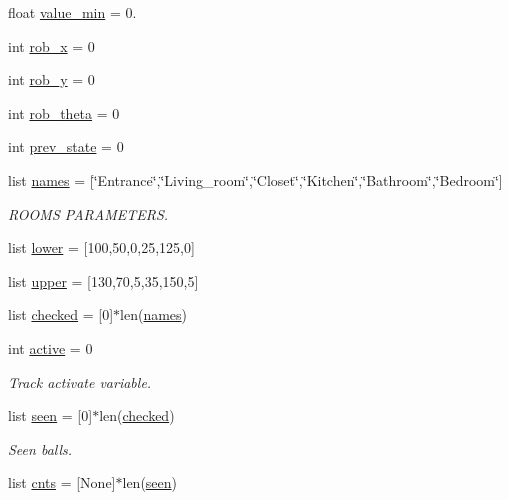 \begin{DoxyCompactItemize}
\item 
float \hyperlink{namespacePerception_ac133c0d0f793260fe4d078d02ec777b6}{value\+\_\+min} = 0.
\item 
int \hyperlink{namespacePerception_a47402108dd4d75ac8a27e5d917aa022c}{rob\+\_\+x} = 0
\item 
int \hyperlink{namespacePerception_ace15e3c972e7a909673f2280e02954a5}{rob\+\_\+y} = 0
\item 
int \hyperlink{namespacePerception_ab4a40230ffe1d9f53908c2c5c6fd6ebb}{rob\+\_\+theta} = 0
\item 
int \hyperlink{namespacePerception_ad34a03e4d4afc6f3f824f912c28692ff}{prev\+\_\+state} = 0
\item 
list \hyperlink{namespacePerception_ade020d1959a087b5a07fd0936a5f489d}{names} = \mbox{[}\char`\"{}Entrance\char`\"{},\char`\"{}Living\+\_\+room\char`\"{},\char`\"{}Closet\char`\"{},\char`\"{}Kitchen\char`\"{},\char`\"{}Bathroom\char`\"{},\char`\"{}Bedroom\char`\"{}\mbox{]}
\begin{DoxyCompactList}\small\item\em R\+O\+O\+MS P\+A\+R\+A\+M\+E\+T\+E\+RS. \end{DoxyCompactList}\item 
list \hyperlink{namespacePerception_a4166a4d5dfba1d1c65be4e69bed3a442}{lower} = \mbox{[}100,50,0,25,125,0\mbox{]}
\item 
list \hyperlink{namespacePerception_a0d76072dc5634b931abcd5275677b670}{upper} = \mbox{[}130,70,5,35,150,5\mbox{]}
\item 
list \hyperlink{namespacePerception_a47f799f9c4dfa904981d74938dcd5e49}{checked} = \mbox{[}0\mbox{]}$\ast$len(\hyperlink{namespacePerception_ade020d1959a087b5a07fd0936a5f489d}{names})
\item 
int \hyperlink{namespacePerception_a78a55345c0afe004ebc5bd95007dccf0}{active} = 0
\begin{DoxyCompactList}\small\item\em Track activate variable. \end{DoxyCompactList}\item 
list \hyperlink{namespacePerception_a2df199890febf0c129179eacf940dbaa}{seen} = \mbox{[}0\mbox{]}$\ast$len(\hyperlink{namespacePerception_a47f799f9c4dfa904981d74938dcd5e49}{checked})
\begin{DoxyCompactList}\small\item\em Seen balls. \end{DoxyCompactList}\item 
list \hyperlink{namespacePerception_ae9b407646d9596cc4c837cadcc084168}{cnts} = \mbox{[}None\mbox{]}$\ast$len(\hyperlink{namespacePerception_a2df199890febf0c129179eacf940dbaa}{seen})

\end{DoxyCompactItemize}
